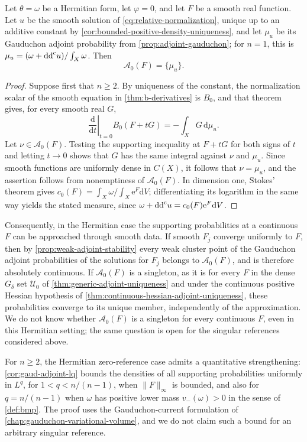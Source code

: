 \begin{theorem}
\label{thm:normalization-gauduchon-recovery}
Let $\theta=\omega$ be a Hermitian form, let $\varphi=0$, and let $F$ be a smooth real function. Let $u$ be the smooth solution of \eqref{eq:relative-normalization}, unique up to an additive constant by \cref{cor:bounded-positive-density-uniqueness}, and let $\mu_u$ be its Gauduchon adjoint probability from \cref{prop:adjoint-gauduchon}; for $n=1$, this is $\mu_u=(\omega+\mathrm{dd}^{\mathrm{c}} u)/\int_X\omega$. Then
\[
 \mathcal A_0(F)=\{\mu_u\}.
\]
\end{theorem}
\begin{proof}
Suppose first that $n\geq2$. By uniqueness of the constant, the normalization scalar of the smooth equation in \cref{thm:b-derivatives} is $B_0$, and that theorem gives, for every smooth real $G$,
\[
 \left.\frac{\mathrm{d}}{\mathrm{d}t}\right|_{t=0}B_0(F+tG)
 =-\int_XG\,\mathrm{d}\mu_u.
\]
Let $\nu\in\mathcal A_0(F)$. Testing the supporting inequality at $F+tG$ for both signs of $t$ and letting $t\to0$ shows that $G$ has the same integral against $\nu$ and $\mu_u$. Since smooth functions are uniformly dense in $C(X)$, it follows that $\nu=\mu_u$, and the assertion follows from nonemptiness of $\mathcal A_0(F)$. In dimension one, Stokes' theorem gives
$c_0(F)=\int_X\omega/\int_X\mathrm{e}^F \mathrm{d}V$; differentiating its logarithm in the same way yields the stated measure, since $\omega+\mathrm{dd}^{\mathrm{c}} u=c_0(F)\mathrm{e}^F\mathrm{d}V$.
\end{proof}

Consequently, in the Hermitian case the supporting probabilities at a continuous $F$ can be approached through smooth data. If smooth $F_j$ converge uniformly to $F$, then by \cref{prop:weak-adjoint-stability} every weak cluster point of the Gauduchon adjoint probabilities of the solutions for $F_j$ belongs to $\mathcal A_0(F)$, and is therefore absolutely continuous. If $\mathcal A_0(F)$ is a singleton, as it is for every $F$ in the dense $G_\delta$ set $\mathscr U_0$ of \cref{thm:generic-adjoint-uniqueness} and under the continuous positive Hessian hypothesis of \cref{thm:continuous-hessian-adjoint-uniqueness}, these probabilities converge to its unique member, independently of the approximation. We do not know whether $\mathcal A_0(F)$ is a singleton for every continuous $F$, even in this Hermitian setting; the same question is open for the singular references considered above.

For $n\geq2$, the Hermitian zero-reference case admits a quantitative strengthening: \cref{cor:gaud-adjoint-lq} bounds the densities of all supporting probabilities uniformly in $L^q$, for $1<q<n/(n-1)$, when $\|F\|_\infty$ is bounded, and also for $q=n/(n-1)$ when $\omega$ has positive lower mass $v_-(\omega)>0$ in the sense of \cref{def:bmp}. The proof uses the Gauduchon-current formulation of \cref{chap:gauduchon-variational-volume}, and we do not claim such a bound for an arbitrary singular reference.

